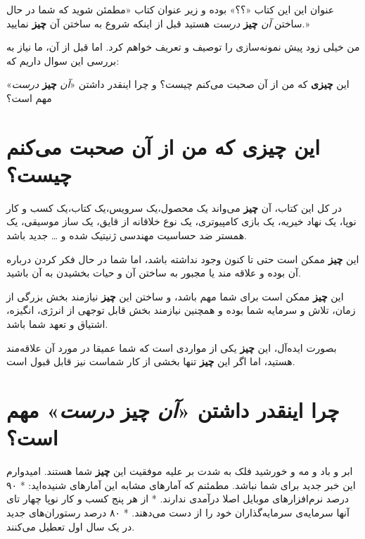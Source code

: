 عنوان این این کتاب «؟؟» بوده و زیر عنوان کتاب «مطمئن شوید که شما در حال
ساختن \emph{آن} \textbf{چیز} \emph{درست} هستید قبل از اینکه شروع به
ساختن آن \textbf{چیز} نمایید.»

من خیلی زود پیش نمونه‌سازی را توصیف و تعریف خواهم کرد. اما قبل از آن، ما
نیاز به بررسی این سوال داریم که:

این \textbf{چیزی} که من از آن صحبت می‌کنم چیست؟ و چرا اینقدر داشتن
«\emph{آن} \textbf{چیز} \emph{درست}» مهم است؟

\section{این \textbf{چیزی} که من از آن صحبت می‌کنم
چیست؟}\label{ux627ux6ccux646-ux686ux6ccux632ux6cc-ux6a9ux647-ux645ux646-ux627ux632-ux622ux646-ux635ux62dux628ux62a-ux645ux6ccux6a9ux646ux645-ux686ux6ccux633ux62a}

در کل این کتاب، آن \textbf{چیز} می‌واند یک محصول،یک سرویس،یک کتاب،یک کسب
و کار نوپا، یک نهاد خیریه، یک بازی کامپیوتری، یک نوع خلاقانه از قایق، یک
ساز موسیقی، یک همستر ضد حساسیت مهندسی ژنیتیک شده و \ldots{} جدید باشد.

این \textbf{چیز} ممکن است حتی تا کنون وجود نداشته باشد، اما شما در حال
فکر کردن درباره آن بوده و علاقه مند یا مجبور به ساختن آن و حیات بخشیدن
به آن باشید.

این \textbf{چیز} ممکن است برای شما مهم باشد، و ساختن این \textbf{چیز}
نیازمند بخش بزرگی از زمان، تلاش و سرمایه شما بوده و همچنین نیازمند بخش
قابل توجهی از انرژی، انگیزه، اشتیاق و تعهد شما باشد.

بصورت ایده‌آل، این \textbf{چیز} یکی از مواردی است که شما عمیقا در مورد
آن علاقه‌مند هستید، اما اگر این \textbf{چیز} تنها بخشی از کار شماست نیز
قابل قبول است.

\section{چرا اینقدر داشتن «\emph{آن} \textbf{چیز} \emph{درست}» مهم
است؟}\label{ux686ux631ux627-ux627ux6ccux646ux642ux62fux631-ux62fux627ux634ux62aux646-ux622ux646-ux686ux6ccux632-ux62fux631ux633ux62a-ux645ux647ux645-ux627ux633ux62a}

ابر و باد و مه و خورشید فلک به شدت بر علیه موفقیت این \textbf{چیز} شما
هستند. امیدوارم این خبر جدید برای شما نباشد. مطمئنم که آمارهای مشابه این
آمارهای شنیده‌اید: * ۹۰ درصد نرم‌افزارهای موبایل اصلا درآمدی ندارند. *
از هر پنج کسب و کار نوپا چهار تای آنها سرمایه‌ی سرمایه‌گذاران خود را از
دست می‌دهند. * ۸۰ درصد رستوران‌های جدید در یک سال اول تعطیل می‌کنند.


